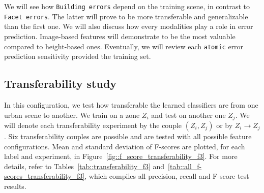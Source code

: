     We will see how \texttt{Building errors} depend on the training scene, in contrast to \texttt{Facet errors}.
    The latter will prove to be more transferable and generalizable than the first one.
    We will also discuss how every modalities play a role in error prediction.
    Image-based features will demonstrate to be the most valuable compared to height-based ones.
    Eventually, we will review each \texttt{atomic} error prediction sensitivity provided the training set.

    \subsection{Transferability study}
        \label{subsec::more_experiments::scalability::transferability}
        In this configuration, we test how transferable the learned classifiers are from one urban scene to another.
        We train on a zone $Z_i$ and test on another one $Z_j$.
        We will denote each transferability experiment by the couple $(Z_i, Z_j)$ or by $Z_i \rightarrow Z_j$.
        Six transferability couples are possible and are tested with all possible feature configurations.
        Mean and standard deviation of F-scores are plotted, for each label and experiment, in Figure~\ref{fig::f_score_transferability_f3}.
        For more details, refer to Tables~\ref{tab::transferability_f3} and~\ref{tab::all_f-scores_transferability_f3}, which compiles all precision, recall and F-score test results.\\
        
